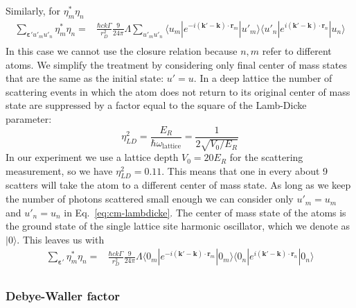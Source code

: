 \documentclass[11pt,letter]{article}
\newcommand{\bv}[1]{\ensuremath{\bm{#1}}}
\begin{document}
Similarly, for $\eta_{m}^{*}\eta_{n}$
\begin{equation}
\begin{split}
 \sum_{\bv{\varepsilon}' u'_{m} u'_{n}} \eta_{m}^{*}\eta_{n} = & 
    \frac{\hbar c k \Gamma}{r_{D}^{2}}  
    \frac{9}{24\pi} \Lambda
 \sum_{u'_{m} u'_{n}} 
      \langle u_{m} | e^{-i(\bv{k}'-\bv{k}) \cdot\bv{r}_{m}} | u'_{m}  \rangle
      \langle u'_{n} | e^{i(\bv{k}'-\bv{k}) \cdot\bv{r}_{n}} | u_{n}  \rangle \\
\end{split}
\label{eq:cm-lambdicke}
\end{equation}
In this case we cannot use the closure relation because $n,m$ refer to
different atoms.   We simplify the treatment by considering only final center
of mass states that are the same as the initial state: $u'=u$.  In a deep
lattice the number of scattering events in which the atom does not return to
its original center of mass state are suppressed by a factor equal to the
square of the Lamb-Dicke parameter:
\begin{equation}
 \eta_{LD}^{2} = \frac{E_{R}}{ \hbar \omega_{\text{lattice} }  }
  =  \frac{ 1 }{ 2\sqrt{V_{0}/E_{R}} }
\end{equation}
In our experiment we use a lattice depth $V_{0}= 20 E_{R}$ for the scattering
measurement, so we have $\eta_{LD}^{2} =  0.11$.   This means that one in every
about 9 scatters will take the atom to a different center of mass state. As
long as we keep the number of photons scattered small enough we can consider
only $u'_{m}=u_{m}$ and $u'_{n}=u_{n}$ in Eq.~\ref{eq:cm-lambdicke}.  The
center of mass state of the atoms is the ground state of the single lattice
site harmonic oscillator, which we denote as $|0\rangle$.  This leaves us with 
\begin{equation}
\begin{split}
 \sum_{\bv{\varepsilon}' } \eta_{m}^{*}\eta_{n} = & 
  \frac{\hbar c k \Gamma}{r_{D}^{2}}  
    \frac{9}{24\pi} \Lambda
      \langle 0_{m} | e^{-i(\bv{k}'-\bv{k}) \cdot\bv{r}_{m}} | 0_{m}  \rangle
      \langle 0_{n} | e^{i(\bv{k}'-\bv{k}) \cdot\bv{r}_{n}} | 0_{n}  \rangle \\
\end{split}
\end{equation}

\subsubsection{Debye-Waller factor} 
\end{document}
